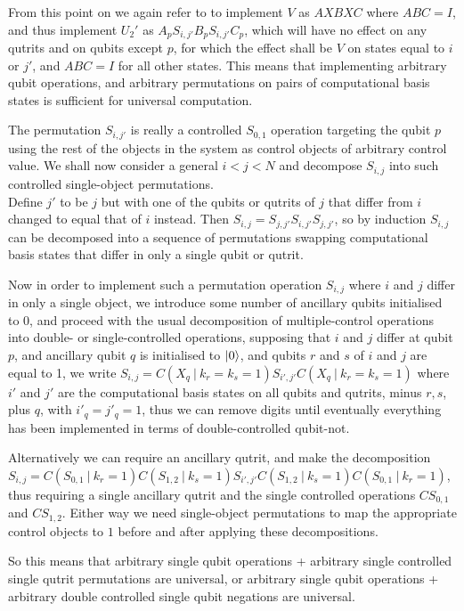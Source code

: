 From this point on we again refer to \cite{textbook} to implement $V$ as $AXBXC$ where $ABC=I$, and thus implement $U_2'$ as $A_pS_{i,j'}B_pS_{i,j'}C_p$, which will have no effect on any qutrits and on qubits except $p$, for which the effect shall be $V$ on states equal to $i$ or $j'$, and $ABC=I$ for all other states. This means that implementing arbitrary qubit operations, and arbitrary permutations on pairs of computational basis states is sufficient for universal computation.

The permutation $S_{i,j'}$ is really a controlled $S_{0,1}$ operation targeting the qubit $p$ using the rest of the objects in the system as control objects of arbitrary control value. We shall now consider a general $i < j < N$ and decompose $S_{i,j}$ into such controlled single-object permutations.
\\Define $j'$ to be $j$ but with one of the qubits or qutrits of $j$ that differ from $i$ changed to equal that of $i$ instead. Then $S_{i,j} = S_{j,j'}S_{i,j'}S_{j,j'}$, so by induction $S_{i,j}$ can be decomposed into a sequence of permutations swapping computational basis states that differ in only a single qubit or qutrit.

Now in order to implement such a permutation operation $S_{i,j}$ where $i$ and $j$ differ in only a single object, we introduce some number of ancillary qubits initialised to 0, and proceed with the usual decomposition of multiple-control operations into double- or single-controlled operations, supposing that $i$ and $j$ differ at qubit $p$, and ancillary qubit $q$ is initialised to $| 0 \rangle$, and qubits $r$ and $s$ of $i$ and $j$ are equal to 1, we write $S_{i,j} = C(X_q\ |\ k_r=k_s=1)S_{i',j'}C(X_q\ |\ k_r=k_s=1)$ where $i'$ and $j'$ are the computational basis states on all qubits and qutrits, minus $r, s$, plus $q$, with $i'_q=j'_q=1$, thus we can remove digits until eventually everything has been implemented in terms of double-controlled qubit-not.

Alternatively we can require an ancillary qutrit, and make the decomposition $S_{i,j} = C(S_{0,1}\ |\ k_r=1)C(S_{1,2}\ |\ k_s=1)S_{i',j'}C(S_{1,2}\ |\ k_s=1)C(S_{0,1}\ |\ k_r=1)$, thus requiring a single ancillary qutrit and the single controlled operations $CS_{0,1}$ and $CS_{1,2}$. Either way we need single-object permutations to map the appropriate control objects to $1$ before and after applying these decompositions.

So this means that arbitrary single qubit operations + arbitrary single controlled single qutrit permutations are universal, or arbitrary single qubit operations + arbitrary double controlled single qubit negations are universal.


